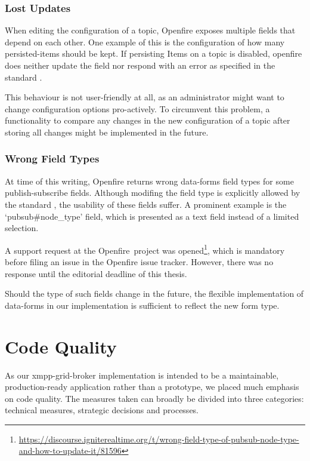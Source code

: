 \subsubsection{Lost Updates}\label{sec:lost-updates}

When editing the configuration of a \gls{topic}, Openfire exposes multiple fields that depend on each other.
One example of this is the configuration of how many \glspl{persisted-item} should be kept.
If persisting Items on a \gls{topic} is disabled, openfire does neither update the field nor respond with an error as specified in the standard \cite{xep-0060, xep-0004}.

This behaviour is not user-friendly at all, as an administrator might want to change configuration options pro-actively. To circumvent this problem, a functionality to compare any changes in the new configuration of a topic after storing all changes might be implemented in the future.

\subsubsection{Wrong Field Types}

At time of this writing, Openfire returns wrong \gls{data-forms} field types for some \gls{publish-subscribe} fields.
Although modifing the field type is explicitly allowed by the standard \cite{xep-0060}, the usability of these fields suffer.
A prominent example is the `pubsub\#node\_type' field, which is presented as a text field instead of a limited selection.

A support request at the Openfire~project was opened\footnote{\url{https://discourse.igniterealtime.org/t/wrong-field-type-of-pubsub-node-type-and-how-to-update-it/81596}},
which is mandatory before filing an issue in the Openfire issue tracker.
However, there was no response until the editorial deadline of this thesis.

Should the type of such fields change in the future, the flexible implementation of \gls{data-forms} in our implementation is sufficient to reflect the new form type.

\section{Code Quality}
As our \gls{xmpp-grid-broker} implementation is intended to be a maintainable, production-ready application rather than a prototype, we placed much emphasis on code quality.
The measures taken can broadly be divided into three categories: technical measures, strategic decisions and processes.

